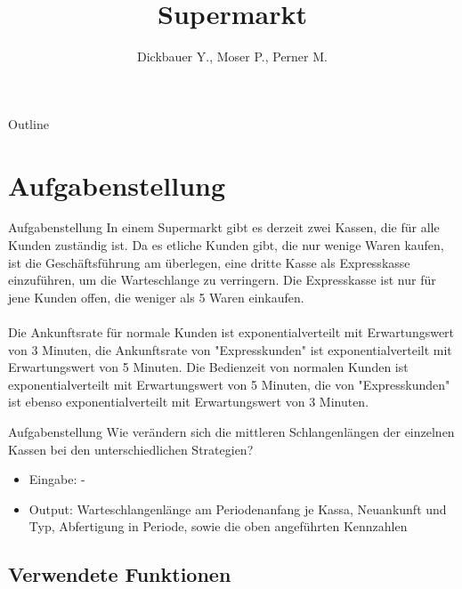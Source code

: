 

\title[BSP30 - Supermarkt]{Supermarkt}
\author{Dickbauer Y., Moser P., Perner M.}



\begin{frame}
  \titlepage
\end{frame}

\begin{frame}{Outline}
  \tableofcontents
\end{frame}

\section{Aufgabenstellung}
\begin{frame}{Aufgabenstellung}
In einem Supermarkt gibt es derzeit zwei Kassen, die für alle Kunden zuständig ist. Da es etliche Kunden gibt, die nur wenige Waren kaufen, ist die Geschäftsführung am überlegen, eine dritte Kasse als Expresskasse einzuführen, um die Warteschlange zu verringern. Die Expresskasse ist nur für jene Kunden offen, die weniger als 5 Waren einkaufen.
\\~\\
Die Ankunftsrate für normale Kunden ist exponentialverteilt mit Erwartungswert von 3 Minuten, die Ankunftsrate von "Expresskunden" ist exponentialverteilt mit Erwartungswert von 5 Minuten. Die Bedienzeit von normalen Kunden ist exponentialverteilt mit Erwartungswert von 5 Minuten, die von "Expresskunden" ist ebenso exponentialverteilt mit Erwartungswert von 3 Minuten.
\end{frame}

\begin{frame}{Aufgabenstellung}
Wie verändern sich die mittleren Schlangenlängen der einzelnen Kassen bei den unterschiedlichen Strategien?
\vspace{1cm}
\begin{itemize}
  \item Eingabe: -
  \item Output: Warteschlangenlänge am Periodenanfang je Kassa, Neuankunft und Typ, Abfertigung in Periode, sowie die oben angeführten Kennzahlen
\end{itemize}
\end{frame}

\subsection{Verwendete Funktionen}
%

